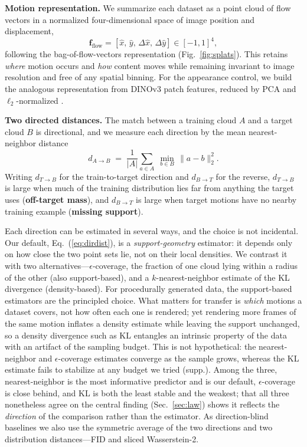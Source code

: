 \documentclass[runningheads]{llncs}
\newcommand{\dtb}{d_{T\to B}}
\newcommand{\dbt}{d_{B\to T}}
\begin{document}
\noindent\textbf{Motion representation.}
We summarize each dataset as a point cloud of flow vectors in a normalized
four-dimensional space of image position and displacement,
\begin{equation}
\mathbf{f}_{\text{flow}} = [\hat{x},\, \hat{y},\, \Delta\hat{x},\,
\Delta\hat{y}] \in [-1,1]^4,
\label{eq:bfv}
\end{equation}
following the bag-of-flow-vectors representation (Fig.~\ref{fig:splats}). This
retains \emph{where} motion occurs and \emph{how} content moves while remaining
invariant to image resolution and free of any spatial binning. For the
appearance control, we build the analogous representation from DINOv3 patch
features, reduced by PCA and $\ell_2$-normalized \cite{simeoni2025dinov3}.

\noindent\textbf{Two directed distances.}
The match between a training cloud $A$ and a target cloud $B$ is directional,
and we measure each direction by the mean nearest-neighbor distance
\begin{equation}
d_{A \to B} \;=\; \frac{1}{|A|}\sum_{a \in A}\; \min_{b \in B}\,
\lVert a - b \rVert_2^2 .
\label{eq:dirdist}
\end{equation}
Writing $\dtb$ for the train-to-target direction and $\dbt$ for the reverse,
$\dtb$ is large when much of the training distribution lies far from anything
the target uses (\textbf{off-target mass}), and $\dbt$ is large when target
motions have no nearby training example (\textbf{missing support}).

Each direction can be estimated in several ways, and the choice is not
incidental. Our default, Eq.~(\ref{eq:dirdist}), is a \emph{support-geometry}
estimator: it depends only on how close the two point sets lie, not on their
local densities. We contrast it with two alternatives---$\epsilon$-coverage,
the fraction of one cloud lying within a radius of the other (also
support-based), and a $k$-nearest-neighbor estimate of the KL divergence
(density-based). For procedurally generated data, the support-based estimators
are the principled choice. What matters for transfer is \emph{which} motions a
dataset covers, not how often each one is rendered; yet rendering more frames
of the same motion inflates a density estimate while leaving the support
unchanged, so a density divergence such as KL entangles an intrinsic property
of the data with an artifact of the sampling budget. This is not hypothetical:
the nearest-neighbor and $\epsilon$-coverage estimates converge as the sample
grows, whereas the KL estimate fails to stabilize at any budget we tried
(supp.). Among the three, nearest-neighbor is the most informative predictor
and is our default, $\epsilon$-coverage is close behind, and KL is both the
least stable and the weakest; that all three nonetheless agree on the central
finding (Sec.~\ref{sec:law}) shows it reflects the \emph{direction} of the
comparison rather than the estimator. As direction-blind baselines we also use
the symmetric average of the two directions and two distribution
distances---FID \cite{heusel2018ganstrainedtimescaleupdate} and sliced
Wasserstein-2.
\end{document}
